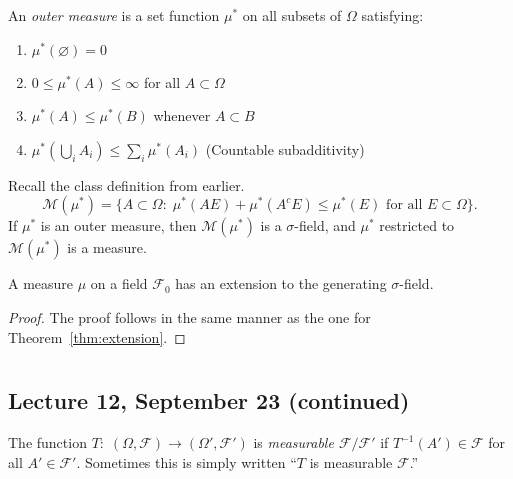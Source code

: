 \documentclass[11pt,fleqn]{book} %
\begin{document}
\begin{definition} \label{def:outer-measure}
	An \emph{outer measure} is a set function $\mu^*$ on all subsets of $\Omega$ satisfying:
	\begin{enumerate}[label=(\roman*)]
		\item $\mu^*(\varnothing) = 0$
		\item $0 \leq \mu^*(A) \leq \infty$ for all $A \subset \Omega$
		\item $\mu^*(A) \leq \mu^*(B)$ whenever $A \subset B$
		\item $\mu^*(\bigcup_i A_i) \leq \sum_i \mu^*(A_i)$ (Countable subadditivity)
	\end{enumerate}
\end{definition}

\begin{theorem} \label{thm:outer-measure}
	Recall the class definition from earlier.
	\[
		\mathcal{M}(\mu^*) = \{A \subset \Omega:\;\mu^*(AE) + \mu^*(A^cE) \leq \mu^*(E) \textrm{ for all } E \subset \Omega\}.
	\]
	If $\mu^*$ is an outer measure, then $\mathcal{M}(\mu^*)$ is a $\sigma$-field, and $\mu^*$ restricted to $\mathcal{M}(\mu^*)$ is a measure.
\end{theorem}

\begin{theorem} \label{thm:general-measure-extension}
	A measure $\mu$ on a field $\mathcal{F}_0$ has an extension to the generating $\sigma$-field.
\end{theorem}

\begin{proof}
	The proof follows in the same manner as the one for Theorem~\ref{thm:extension}.
\end{proof}




\chapter{}

\section{Lecture 12, September 23 (continued)}

\begin{definition} \label{def:measurable-function}
	The function $T:\;(\Omega,\mathcal{F}) \to (\Omega',\mathcal{F}')$ is \emph{measurable $\mathcal{F}/\mathcal{F}'$} if $T^{-1}(A') \in \mathcal{F}$ for all $A' \in \mathcal{F}'$. Sometimes this is simply written ``$T$ is measurable $\mathcal{F}$.''
\end{definition}
\end{document}
